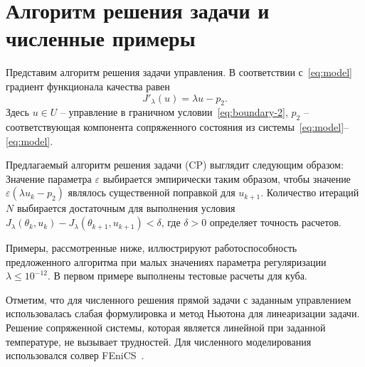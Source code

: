 \section{Алгоритм решения задачи и численные примеры}\label{sec:experiments}
Представим алгоритм решения задачи управления.
В соответствии с~\eqref{eq:model} градиент функционала качества равен
\[
    J'_\lambda (u) = \lambda u - p_2.
\]
Здесь $u\in U$ -- управление в граничном условии~\eqref{eq:boundary-2}, $p_2$ -- соответствующая компонента
сопряженного состояния из системы~\eqref{eq:model}--\eqref{eq:model}.

Предлагаемый алгоритм решения задачи (CP) выглядит следующим образом:
Значение параметра $\varepsilon$ выбирается эмпирически таким образом, чтобы значение
$\varepsilon (\lambda u_k - p_2)$ являлось существенной поправкой для $u_{k+1}$.
Количество итераций $N$ выбирается достаточным для выполнения условия
$J_\lambda(\theta_k, u_k) - J_\lambda(\theta_{k+1}, u_{k+1}) < \delta$, где $\delta>0$ определяет точность расчетов.

Примеры, рассмотренные ниже, иллюстрируют работоспособность предложенного алгоритма при
малых значениях параметра регуляризации $\lambda \leq 10^{-12}$.
В первом примере выполнены тестовые расчеты для куба.

Отметим, что для численного решения прямой задачи с заданным
управлением использовалась слабая формулировка
и метод Ньютона для линеаризации задачи.
Решение сопряженной системы, которая является линейной при
заданной температуре, не вызывает трудностей.
Для численного моделирования использовался солвер FEniCS~\cite{fenics, dolfin}.

